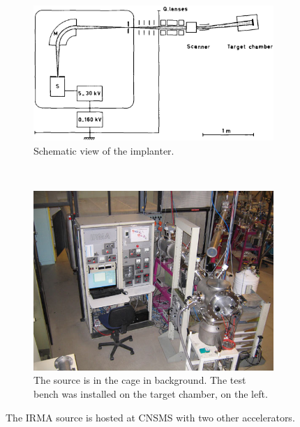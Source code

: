 \begin{figure}[!ht]
	\begin{subfigure}[t]{0.5\textwidth}
		\includegraphics[width=\textwidth]{04_IPHI_Test/figures/fig000_IRMA01}
		\caption{Schematic view of the implanter.}
		\label{}
	\end{subfigure}
	~
	\begin{subfigure}[t]{0.5\textwidth}
		\includegraphics[width=\textwidth]{04_IPHI_Test/figures/fig000_IRMA02}
		\caption{The source is in the cage in background. The test bench was installed on the target chamber, on the left.}
		\label{}
	\end{subfigure}
	\caption[The IRMA source is hosted at CNSMS with two other accelerators]{The IRMA source is hosted at CNSMS with two other accelerators\cite{csnsm2019}.}
	\label{chap4:IRMA}
\end{figure}
